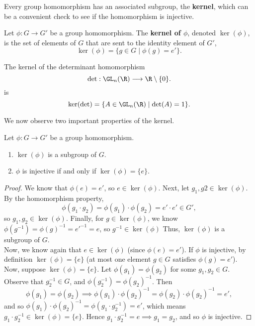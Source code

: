 \documentclass[math1530-lecture-notes]{subfiles}
\begin{document}
Every group homomorphism has an associated subgroup, the \textbf{kernel}, which can be a convenient
check to see if the homomorphism is injective.
\begin{definition}[Kernel]{}
  Let $\phi:G\to G'$ be a group homomorphism. The \textbf{kernel of $\phi$}, denoted
  $\ker\left(\phi\right)$, is the set of elements of $G$ that are sent to the identity element of
  $G'$, \[
    \ker\left(\phi\right)=\{g\in G\mid \phi(g)=e'\} 
  .\] 
\end{definition}

\begin{example}
  The kernel of the determinant homomorphism \[
    \det:\GL_n(\R)\longrightarrow \R\setminus \{ 0 \}
  .\] 
   is \[
    \ker(\det) = \{A\in \GL_n(\R) \mid \det(A)=1\} 
  .\] 
\end{example}

We now observe two important properties of the kernel.
\begin{proposition}{}
  Let $\phi: G \to G'$ be a group homomorphism.
  \begin{enumerate}
    \item $\ker(\phi)$ is a subgroup of $G$.
    \item $\phi$ is injective if and only if $\ker(\phi)=\{ e \}$.
  \end{enumerate}
\end{proposition}
\begin{proof}[Proof]
  We know that $\phi(e)=e'$, so $e\in \ker(\phi)$. Next, let $ g_1,g2\in \ker(\phi)$. By the
  homomorphism property, \[
    \phi(g_1\cdot g_2) = \phi(g_1) \cdot  \phi(g_2) = e'\cdot e'\in G'
  ,\] so $g_1,g_2\in \ker(\phi)$. Finally, for $g\in \ker(\phi)$, we know
  $\phi(g^{-1})=\phi(g)^{-1}=e'^{-1}=e$, so $g^{-1}\in \ker(\phi)$ Thus, $\ker(\phi)$ is a subgroup
  of $G$.\\

  Now, we know again that $e\in \ker(\phi)$ (since $\phi(e)=e'$). If $\phi$ is injective, by
  definition $\ker(\phi)=\{ e \}$ (at most one element $g\in G$ satisfies $\phi(g)=e'$).\\
  Now, suppose $\ker(\phi)=\{ e \}$. Let $\phi(g_1)=\phi(g_2)$ for some $g_1,g_2\in G$. Observe that
  $ g_2^{-1}\in G$, and $\phi(g_2^{-1})=\phi(g_2)^{-1}$. Then \[
    \phi(g_1)=\phi(g_2) \implies \phi(g_1)\cdot \phi(g_2)^{-1}=\phi(g_2)\cdot \phi(g_2)^{-1}=e'
  ,\] and so $\phi(g_1)\cdot \phi(g_2)^{-1}=\phi(g_1\cdot g_2^{-1})=e'$, which means $g_1\cdot
  g_2^{-1}\in \ker(\phi)=\{ e \}$. Hence $ g_1\cdot g_2^{-1}=e\implies g_1=g_2$, and so $\phi$ is
  injective.
\end{proof}
\end{document}
